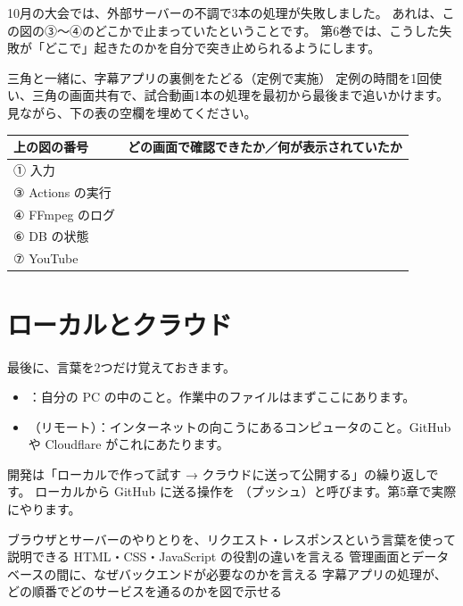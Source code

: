 10月の大会では、外部サーバーの不調で3本の処理が失敗しました。
あれは、この図の③〜④のどこかで止まっていたということです。
第6巻では、こうした失敗が「どこで」起きたのかを自分で突き止められるようにします。

\begin{step}{三角と一緒に、字幕アプリの裏側をたどる（定例で実施）}
定例の時間を1回使い、三角の画面共有で、試合動画1本の処理を最初から最後まで追いかけます。
見ながら、下の表の空欄を埋めてください。

\medskip
\begin{tabularx}{\linewidth}{l X}
\toprule
上の図の番号 & どの画面で確認できたか／何が表示されていたか \\
\midrule
① 入力 & \\[6pt]
③ Actions の実行 & \\[6pt]
④ FFmpeg のログ & \\[6pt]
⑥ DB の状態 & \\[6pt]
⑦ YouTube & \\[6pt]
\bottomrule
\end{tabularx}
\end{step}

\section{ローカルとクラウド}

最後に、言葉を2つだけ覚えておきます。

\begin{itemize}
  \item {}：自分の PC の中のこと。作業中のファイルはまずここにあります。
  \item {}（リモート）：インターネットの向こうにあるコンピュータのこと。GitHub や Cloudflare がこれにあたります。
\end{itemize}

開発は「ローカルで作って試す → クラウドに送って公開する」の繰り返しです。
ローカルから GitHub に送る操作を （プッシュ）と呼びます。第5章で実際にやります。

\begin{checklist}
\begin{itemize}
  \checkitem ブラウザとサーバーのやりとりを、リクエスト・レスポンスという言葉を使って説明できる
  \checkitem HTML・CSS・JavaScript の役割の違いを言える
  \checkitem 管理画面とデータベースの間に、なぜバックエンドが必要なのかを言える
  \checkitem 字幕アプリの処理が、どの順番でどのサービスを通るのかを図で示せる
\end{itemize}
\end{checklist}
